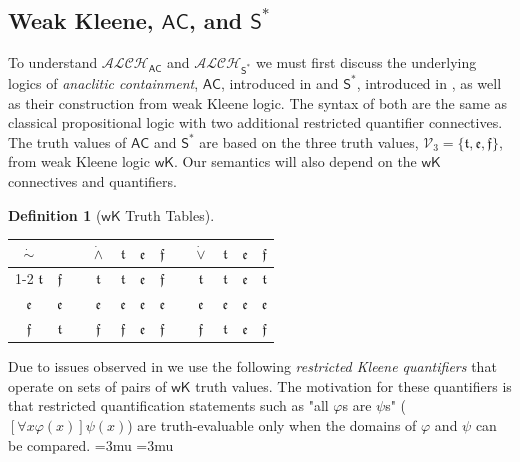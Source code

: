 \documentclass[letterpaper]{article} %
\theoremstyle{definition}
\theoremstyle{definition}
\newtheorem{definition}{Definition}
\theoremstyle{definition}
\theoremstyle{definition}
\theoremstyle{definition}
\newcommand{\strongneg}{\mathord{\sim}}
\newcommand{\vt}{\mathfrak{t}}
\newcommand{\vf}{\mathfrak{f}}
\newcommand{\vu}{\mathfrak{e}}
\begin{document}
\subsection{Weak Kleene, $\mathsf{AC}$, and $\mathsf{S}^*$}
To understand $\mathcal{ALCH}_\mathsf{AC}$ and $\mathcal{ALCH}_{\mathsf{S}^*}$ we must first discuss the underlying logics of \textit{anaclitic containment}, $\mathsf{AC}$, introduced in \cite{Angell1977-ANGTSO-9} and $\mathsf{S}^*$, introduced in \cite{Daniels1990-DANANO-3}, as well as their construction from weak Kleene logic. The syntax of both are the same as classical propositional logic with two additional restricted quantifier connectives. The truth values of $\mathsf{AC}$ and $\mathsf{S}^*$ are based on the three truth values, $\mathcal{V}_3 = \{\vt, \vu, \vf\}$, from weak Kleene logic $\mathsf{wK}$. Our semantics will also depend on the $\mathsf{wK}$ connectives and quantifiers.  
\begin{definition}[$\mathsf{wK}$ Truth Tables]
\leavevmode\par\noindent
\begin{tabular}{c|c c c|ccc c c|ccc}
    $\dot{\strongneg}$ & && $\dot{\wedge}$ & $\vt$ & $\vu$ & $\vf$ && $\dot{\vee}$ & $\vt$ & $\vu$ & $\vf$\\
    \cline{1-2}\cline{4-7}\cline{9-12}
    $\vt$ & $\vf$ && $\vt$ & $\vt$ & $\vu$ & $\vf$ && $\vt$ & $\vt$ & $\vu$ & $\vt$\\
    $\vu$ & $\vu$ && $\vu$ & $\vu$ & $\vu$ & $\vu$ && $\vu$ & $\vu$ & $\vu$ & $\vu$\\
    $\vf$ & $\vt$ && $\vf$ & $\vf$ & $\vu$ & $\vf$ && $\vf$ & $\vt$ & $\vu$ & $\vf$\\
\end{tabular}
\end{definition}
\noindent Due to issues observed in \cite{DBLP:conf/tableaux/Ferguson21,DBLP:conf/dlog/Ferguson21} we use the following \textit{restricted Kleene quantifiers} that operate on sets of pairs of $\mathsf{wK}$ truth values. The motivation for these quantifiers is that restricted quantification statements such as "all $\varphi$s are $\psi$s" ($[\forall x\varphi(x)]\psi(x)$) are truth-evaluable only when the domains of $\varphi$ and $\psi$ can be compared.
\begingroup
\thickmuskip=3mu
\medmuskip=3mu
\end{document}
